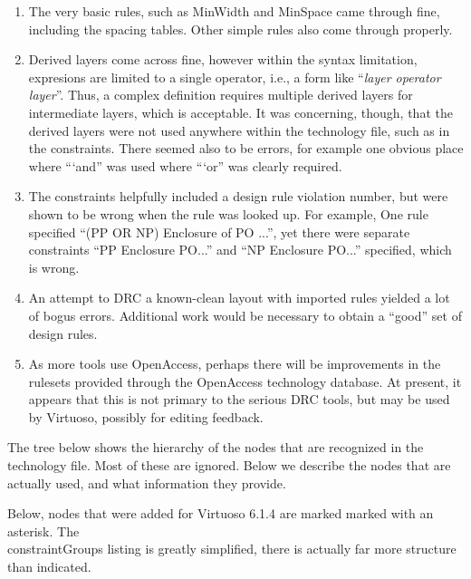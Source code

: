 \begin{enumerate}
\item{The very basic rules, such as {\vt MinWidth} and
{\vt MinSpace} came through fine, including the spacing tables.
Other simple rules also come through properly.}

\item{Derived layers come across fine, however within the syntax
limitation, expresions are limited to a single operator, i.e., a form
like ``{\it layer operator layer\/}''.  Thus, a complex definition
requires multiple derived layers for intermediate layers, which is
acceptable.  It was concerning, though, that the derived layers were
not used anywhere within the technology file, such as in the
constraints.  There seemed also to be errors, for example one obvious
place where ``{\vt `and}'' was used where ``{\vt `or}'' was clearly
required.}

\item{The constraints helpfully included a design rule violation
number, but were shown to be wrong when the rule was looked up.  For
example, One rule specified ``(PP OR NP) Enclosure of PO ...'', yet
there were separate constraints ``PP Enclosure PO...'' and ``NP
Enclosure PO...'' specified, which is wrong.}

\item{An attempt to DRC a known-clean layout with imported rules
yielded a lot of bogus errors.  Additional work would be necessary
to obtain a ``good'' set of design rules.}

\item{As more tools use OpenAccess, perhaps there will be
improvements in the rulesets provided through the OpenAccess
technology database.  At present, it appears that this is not
primary to the serious DRC tools, but may be used by Virtuoso,
possibly for editing feedback.}
\end{enumerate}

The tree below shows the hierarchy of the nodes that are recognized in
the technology file.  Most of these are ignored.  Below we describe
the nodes that are actually used, and what information they provide.

Below, nodes that were added for Virtuoso 6.1.4 are marked marked with
an asterisk.  The\\
{\vt constraintGroups} listing is greatly simplified, there is
actually far more structure than indicated.

